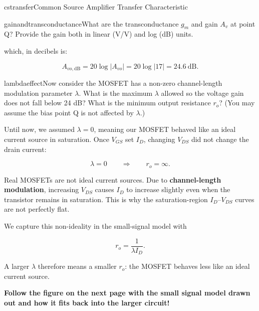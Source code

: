 \begin{mainquestion}{cstransfer}{Common Source Amplifier Transfer Characteristic}
\begin{partquestion}{gainandtransconductance}{What are the transconductance $g_{m}$ and gain $A_{v}$ at point Q? Provide the gain both in linear (V/V) and log (dB) units.}
\begin{answer}
which, in decibels is:

\[
A_{vo,\text{dB}}= 20\log|A_{vo}| = 20\log|17| = 24.6\ \text{dB}.
\]

\end{answer}
\end{partquestion}

\begin{partquestion}{lambdaeffect}{Now consider the MOSFET has a non-zero channel-length modulation parameter $\lambda$. What is the maximum $\lambda$ allowed so the voltage gain does not fall below 24 dB? What is the minimum output resistance $r_{o}$? (You may assume the bias point Q is not affected by $\lambda$.)  }
\begin{answer}

\begin{kaitlyn}
    \noindent{}

    
\end{kaitlyn}

\begin{kaitlyn}


 Until now, we assumed $\lambda=0$, meaning our MOSFET behaved like an ideal current source in saturation. Once $V_{GS}$ set $I_D$, changing $V_{DS}$ did not change the drain current:


 \[\lambda=0 \qquad \Longrightarrow \qquad r_o=\infty.\]

Real MOSFETs are not ideal current sources. Due to \textbf{channel-length modulation}, increasing $V_{DS}$ causes $I_D$ to increase slightly even when the transistor remains in saturation. This is why the saturation-region $I_D$--$V_{DS}$ curves are not perfectly flat.

We capture this non-ideality in the small-signal model with

\[r_o=\frac{1}{\lambda I_D}.\]

A larger $\lambda$ therefore means a smaller $r_o$: the MOSFET behaves less like an ideal current source.


\textbf{Follow the figure on the next page with the small signal model drawn out and how it fits back into the larger circuit!}


\end{kaitlyn}
\end{answer}
\end{partquestion}
\end{mainquestion}
